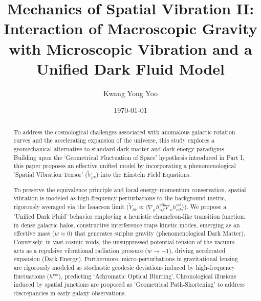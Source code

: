 \documentclass[reprint,amsmath,amssymb,aps,prd]{revtex4-2}
\begin{document}

\title{Mechanics of Spatial Vibration II: Interaction of Macroscopic Gravity with Microscopic Vibration and a Unified Dark Fluid Model}

\author{Kwang Yong Yoo}

\date{\today}

\begin{abstract}
To address the cosmological challenges associated with anomalous galactic rotation curves and the accelerating expansion of the universe, this study explores a geomechanical alternative to standard dark matter and dark energy paradigms. Building upon the `Geometrical Fluctuation of Space' hypothesis introduced in Part I, this paper proposes an effective unified model by incorporating a phenomenological `Spatial Vibration Tensor' ($\tilde{V}_{\mu\nu}$) into the Einstein Field Equations. 

To preserve the equivalence principle and local energy-momentum conservation, spatial vibration is modeled as high-frequency perturbations to the background metric, rigorously averaged via the Isaacson limit ($\tilde{V}_{\mu\nu} \propto \langle \nabla_\mu h_{\alpha\beta}^{vib} \nabla_\nu h^{\alpha\beta}_{vib} \rangle$). We propose a `Unified Dark Fluid' behavior employing a heuristic chameleon-like transition function: in dense galactic halos, constructive interference traps kinetic modes, emerging as an effective mass ($w \approx 0$) that generates surplus gravity (phenomenological Dark Matter). Conversely, in vast cosmic voids, the unsuppressed potential tension of the vacuum acts as a repulsive vibrational radiation pressure ($w \to -1$), driving accelerated expansion (Dark Energy). Furthermore, micro-perturbations in gravitational lensing are rigorously modeled as stochastic geodesic deviations induced by high-frequency fluctuations ($h^{vib}$), predicting `Achromatic Optical Blurring'. Chronological illusions induced by spatial junctions are proposed as `Geometrical Path-Shortening' to address discrepancies in early galaxy observations.
\end{abstract}

\maketitle
\end{document}
